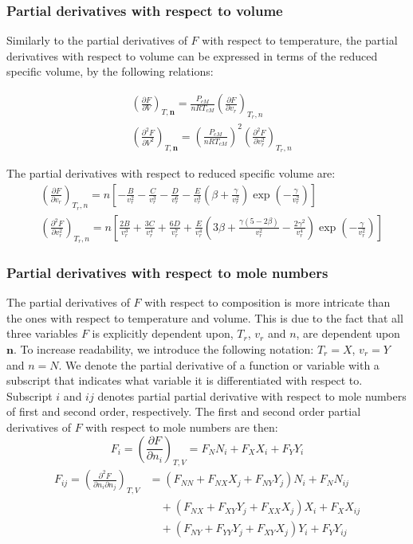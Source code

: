 \documentclass[internal,english]{sintefmemo2012}
\numberwithin{equation}{section}
\newcommand*{\pder}[2]{\left(\frac{\partial #1}{\partial #2}\right)}
\newcommand*{\pdder}[2]{\left(\frac{\partial^2 #1}{\partial #2^2}\right)}
\newcommand*{\pdcross}[3]{\left(\frac{\partial^2 #1}{\partial #2 \partial #3}\right)}
\begin{document}
\subsubsection*{Partial derivatives with respect to volume}
Similarly to the partial derivatives of $F$ with respect to temperature, the partial derivatives with respect to volume can be expressed in terms of the reduced specific volume, by the following relations:

\begin{align}
& \pder{F}{V}_{T, \textbf{n}}  = \frac{P_{cM}}{n R T_{cM}} \pder{F}{v_r}_{T_r,n} \\
& \pdder{F}{V} _{T, \textbf{n}}  = \left(\frac{P_{cM}}{n R T_{cM}} \right)^2 \pdder{F}{v_r}_{T_r,n}
\end{align}

The partial derivatives with respect to reduced specific volume are:
\begin{align}
\label{eq:F_vr}
& \left( \frac{\partial F}{\partial v_r} \right)_{T_r, n} = n \left[ -\frac{B}{v_r^2} - \frac{C}{v_r^3} - \frac{D}{v_r^6} - \frac{E}{v_r^3} \left( \beta + \frac{\gamma}{v_r^2} \right)\exp \left(-\frac{\gamma}{v_r^2} \right) \right] \\
\label{eq:F_vrvr}
& \pdder{F}{v_r}_{T_r, n} = n \left[\frac{2B}{v_r^3} + \frac{3C}{v_r^4} + \frac{6D}{v_r^7} + \frac{E}{v_r^4} \left(3\beta + \frac{\gamma(5 - 2\beta)}{v_r^2} -\frac{2\gamma^2}{v_r^4}\right) \exp \left(-\frac{\gamma}{v_r^2} \right)\right]
\end{align}

\subsubsection*{Partial derivatives with respect to mole numbers}
The partial derivatives of $F$ with respect to composition is more intricate than the ones with respect to temperature and volume. This is due to the fact that all three variables $F$ is explicitly dependent upon, $T_r$, $v_r$ and $n$, are dependent upon $\textbf{n}$. To increase readability, we introduce the following notation: $T_r = X$, $v_r = Y$ and $n = N$. We denote the partial derivative of a function or variable with a subscript that indicates what variable it is differentiated with respect to. Subscript $i$ and $ij$ denotes partial partial derivative with respect to mole numbers of first and second order, respectively. The first and second order partial derivatives of $F$ with respect to mole numbers are then:
\begin{equation} 
\label{eq:F_i}
F_i = \pder{F}{n_i}_{T,V} = F_N N_i + F_X X_i + F_Y Y_i
\end{equation}
\begin{equation}
\label{eq:F_ij}
\begin{split}
F_{ij} = \pdcross{F}{n_i}{n_j}_{T,V} & = \left(F_{NN} + F_{NX}X_{j} + F_{NY} Y_{j} \right) N_i + F_N N_{ij}  \\
& \quad + \left( F_{N X} + F_{XY} Y_{j} + F_{XX} X_{j} \right) X_{i} + F_{X} X_{ij} \\
& \quad + \left( F_{N Y} + F_{YY} Y_{j} + F_{XY} X_{j} \right) Y_{i} + F_{Y}Y_{ij} 
\end{split}
\end{equation}
\end{document}
